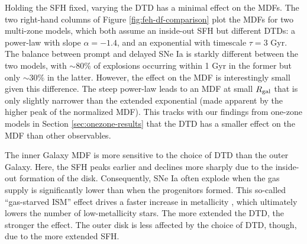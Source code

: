 \documentclass[twocolumn,twocolappendix]{aastex631}
\begin{document}
Holding the SFH fixed, varying the DTD has a minimal effect on the MDFs. The two right-hand columns of Figure \ref{fig:feh-df-comparison} plot the MDFs for two multi-zone models, which both assume an inside-out SFH but different DTDs: a power-law with slope $\alpha=-1.4$, and an exponential with timescale $\tau=3$ Gyr. The balance between prompt and delayed SNe Ia is starkly different between the two models, with $\sim 80\%$ of explosions occurring within 1 Gyr in the former but only $\sim 30\%$ in the latter. However, the effect on the MDF is interestingly small given this difference. The steep power-law leads to an MDF at small $R_{\rm gal}$ that is only slightly narrower than the extended exponential (made apparent by the higher peak of the normalized MDF). This tracks with our findings from one-zone models in Section \ref{sec:onezone-results} that the DTD has a smaller effect on the MDF than other observables.

The inner Galaxy MDF is more sensitive to the choice of DTD than the outer Galaxy. Here, the SFH peaks earlier and declines more sharply due to the inside-out formation of the disk. Consequently, SNe Ia often explode when the gas supply is significantly lower than when the progenitors formed. This so-called ``gas-starved ISM'' effect drives a faster increase in metallicity \citep[see analytic demonstration in][]{Weinberg2017-ChemicalEquilibrium}, which ultimately lowers the number of low-metallicity stars. The more extended the DTD, the stronger the effect. The outer disk is less affected by the choice of DTD, though, due to the more extended SFH.
\end{document}
